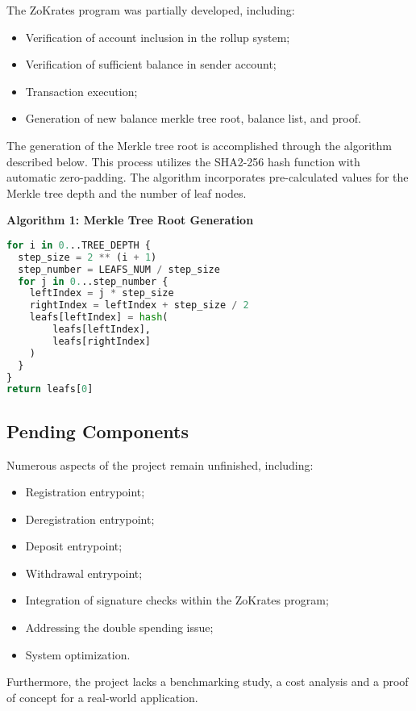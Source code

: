 The ZoKrates program was partially developed, including:
\begin{itemize}
    \item Verification of account inclusion in the rollup system;
    \item Verification of sufficient balance in sender account;
    \item Transaction execution;
    \item Generation of new balance merkle tree root, balance list, and proof.
\end{itemize}

The generation of the Merkle tree root is accomplished through the algorithm described below. This process utilizes the SHA2-256 hash function with automatic zero-padding. The algorithm incorporates pre-calculated values for the Merkle tree depth and the number of leaf nodes.

\noindent\textbf{Algorithm 1: Merkle Tree Root Generation}
\begin{lstlisting}[language=Python]
for i in 0...TREE_DEPTH {
  step_size = 2 ** (i + 1)
  step_number = LEAFS_NUM / step_size
  for j in 0...step_number {
    leftIndex = j * step_size
    rightIndex = leftIndex + step_size / 2
    leafs[leftIndex] = hash(
        leafs[leftIndex],
        leafs[rightIndex]
    )
  }
}
return leafs[0]
\end{lstlisting}

\subsection{Pending Components\label{subsec:pendingcomponents}}
Numerous aspects of the project remain unfinished, including:
\begin{itemize}
  \item Registration entrypoint;
  \item Deregistration entrypoint;
  \item Deposit entrypoint;
  \item Withdrawal entrypoint;
  \item Integration of signature checks within the ZoKrates program;
  \item Addressing the double spending issue;
  \item System optimization.
\end{itemize}
Furthermore, the project lacks a benchmarking study, a cost analysis and a proof of concept for a real-world application.
